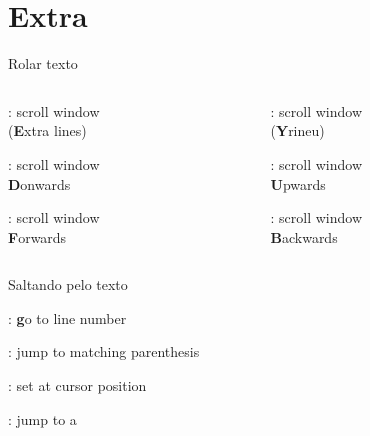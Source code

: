 \section{Extra}

\begin{frame}{Rolar texto}
    \begin{columns}
        \begin{column}{0.5\linewidth}
            \begin{widedescription}
                \item {}: scroll window \\ (\textbf{E}xtra lines)
                \item {}: scroll window \\ \textbf{D}onwards
                \item {}: scroll window \\ \textbf{F}orwards
            \end{widedescription}
        \end{column}
        \begin{column}{0.5\linewidth}
            \begin{widedescription}
                \item {}: scroll window \\ (\textbf{Y}rineu)
                \item {}: scroll window \\ \textbf{U}pwards
                \item {}: scroll window \\ \textbf{B}ackwards
            \end{widedescription}
        \end{column}
    \end{columns}
\end{frame}

\begin{frame}{Saltando pelo texto}
    \begin{widedescription}
        \item {}: \textbf{g}o to line number
        \item \key{\%}: jump to matching parenthesis
        \item {}: set   at cursor position
        \item {}: jump to a 
    \end{widedescription}
\end{frame}

